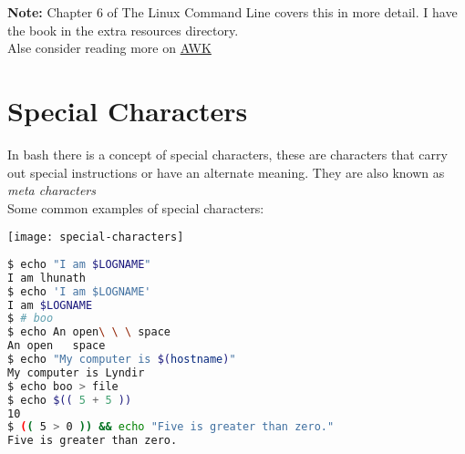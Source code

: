 \documentclass[12pt, letterpaper]{report}
\begin{document}
\textbf{Note:} Chapter 6 of The Linux Command Line covers this in more detail. I have the book in the extra resources directory.\\
Alse consider reading more on \href{http://linuxcommand.org/lc3_adv_awk.php}{AWK}

\section{Special Characters}
In bash there is a concept of special characters, these are characters that 
carry out special instructions or have an alternate meaning. They are also 
known as \textit{meta characters} \\
Some common examples of special characters:
\begin{center}
\texttt{[image: special-characters]}
\end{center}

\begin{lstlisting}[language=Bash,framexleftmargin=5mm,frame=single,xleftmargin=18pt]
$ echo "I am $LOGNAME"
I am lhunath
$ echo 'I am $LOGNAME'
I am $LOGNAME
$ # boo
$ echo An open\ \ \ space
An open   space
$ echo "My computer is $(hostname)"
My computer is Lyndir
$ echo boo > file
$ echo $(( 5 + 5 ))
10
$ (( 5 > 0 )) && echo "Five is greater than zero."
Five is greater than zero.
\end{lstlisting}
\end{document}
